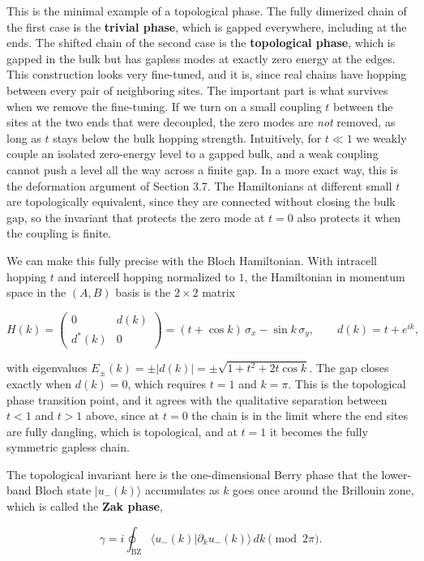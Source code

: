 This is the minimal example of a topological phase. The fully dimerized chain of the first case is the
\textbf{trivial phase}, which is gapped everywhere, including at the ends. The shifted chain of the
second case is the \textbf{topological phase}, which is gapped in the bulk but has gapless modes at
exactly zero energy at the edges. This construction looks very fine-tuned, and it is, since real
chains have hopping between every pair of neighboring sites. The important part is what survives when
we remove the fine-tuning. If we turn on a small coupling $t$ between the sites at the two ends that
were decoupled, the zero modes are \emph{not} removed, as long as $t$ stays below the bulk hopping
strength. Intuitively, for $t \ll 1$ we weakly couple an isolated zero-energy level to a gapped bulk,
and a weak coupling cannot push a level all the way across a finite gap. In a more exact way, this is
the deformation argument of Section 3.7. The Hamiltonians at different small $t$ are topologically
equivalent, since they are connected without closing the bulk gap, so the invariant that protects the
zero mode at $t=0$ also protects it when the coupling is finite.

We can make this fully precise with the Bloch Hamiltonian. With intracell hopping $t$ and intercell
hopping normalized to $1$, the Hamiltonian in momentum space in the $(A,B)$ basis is the $2\times 2$
matrix

\begin{equation}
H(k) = \begin{pmatrix} 0 & d(k) \\ d^*(k) & 0 \end{pmatrix}
= (t + \cos k)\,\sigma_x - \sin k\,\sigma_y, \qquad d(k) = t + e^{ik},
\end{equation}

with eigenvalues $E_\pm(k) = \pm|d(k)| = \pm\sqrt{1 + t^2 + 2t\cos k}$. The gap closes exactly when
$d(k)=0$, which requires $t=1$ and $k=\pi$. This is the topological phase transition point, and it
agrees with the qualitative separation between $t<1$ and $t>1$ above, since at $t=0$ the chain is in
the limit where the end sites are fully dangling, which is topological, and at $t=1$ it becomes the
fully symmetric gapless chain.

The topological invariant here is the one-dimensional Berry phase that the lower-band Bloch state
$|u_-(k)\rangle$ accumulates as $k$ goes once around the Brillouin zone, which is called the
\textbf{Zak phase},

\begin{equation}
\gamma = i \oint_{\text{BZ}} \langle u_-(k)|\partial_k u_-(k)\rangle\, dk \pmod{2\pi}.
\end{equation}

